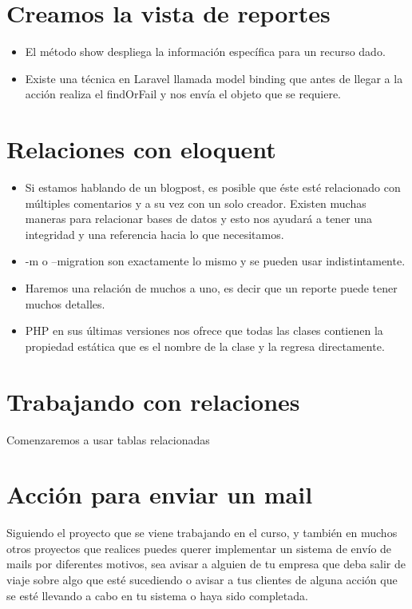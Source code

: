 \documentclass{article}
\begin{document}
\section{Creamos la vista de reportes}%
\begin{itemize}
  \item El método show despliega la información específica para un recurso
    dado.
  \item Existe una técnica en Laravel llamada model binding que antes de llegar
    a la acción realiza el findOrFail y nos envía el objeto que se requiere.
\end{itemize}

\section{Relaciones con eloquent}%
\begin{itemize}
  \item Si estamos hablando de un blogpost, es posible que éste esté
    relacionado con múltiples comentarios y a su vez con un solo creador.
    Existen muchas maneras para relacionar bases de datos y esto nos ayudará a
    tener una integridad y una referencia hacia lo que necesitamos.
  \item -m o –migration son exactamente lo mismo y se pueden usar
    indistintamente.
  \item Haremos una relación de muchos a uno, es decir que un reporte puede
    tener muchos detalles.
  \item PHP en sus últimas versiones nos ofrece que todas las clases contienen
    la propiedad estática que es el nombre de la clase y la regresa
    directamente.
\end{itemize}


\section{Trabajando con relaciones}%
Comenzaremos a usar tablas relacionadas


\section{Acción para enviar un mail}%
Siguiendo el proyecto que se viene trabajando en el curso, y también en muchos
otros proyectos que realices puedes querer implementar un sistema de envío de
mails por diferentes motivos, sea avisar a alguien de tu empresa que deba salir
de viaje sobre algo que esté sucediendo o avisar a tus clientes de alguna
acción que se esté llevando a cabo en tu sistema o haya sido completada.\\
\end{document}
